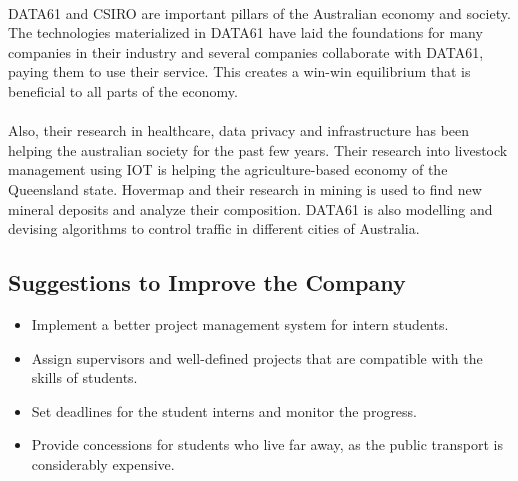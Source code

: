 \paragraph{}
DATA61 and CSIRO are important pillars of the Australian economy and society. The technologies materialized in DATA61 have laid the foundations for many companies in their industry and several companies collaborate with DATA61, paying them to use their service. This creates a win-win equilibrium that is beneficial to all parts of the economy.

\paragraph{}
Also, their research in healthcare, data privacy and infrastructure has been helping the australian society for the past few years. Their research into livestock management using IOT is helping the agriculture-based economy of the Queensland state. Hovermap and their research in mining is used to find new mineral deposits and analyze their composition. DATA61 is also modelling and devising algorithms to control traffic in different cities of Australia. 

\subsection{Suggestions to Improve the Company}
\begin{itemize}
    \item Implement a better project management system for intern students.
    \item Assign supervisors and well-defined projects that are compatible with the skills of students.
    \item Set deadlines for the student interns and monitor the progress.
    \item Provide concessions for students who live far away, as the public transport is considerably expensive.
\end{itemize}